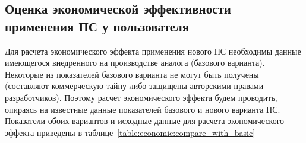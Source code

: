 \subsection{Оценка экономической эффективности применения ПС у пользователя}

 Для расчета экономического эффекта применения нового ПС необходимы данные имеющегося внедренного на производстве аналога (базового варианта). Некоторые из показателей базового варианта не могут быть получены (составляют коммерческую тайну либо защищены авторскими правами разработчиков). Поэтому расчет экономического эффекта будем проводить, опираясь на известные данные показателей базового и нового варианта ПС. Показатели обоих вариантов и исходные данные для расчета экономического эффекта приведены в таблице~\ref{table:economic:compare_with_basic}

